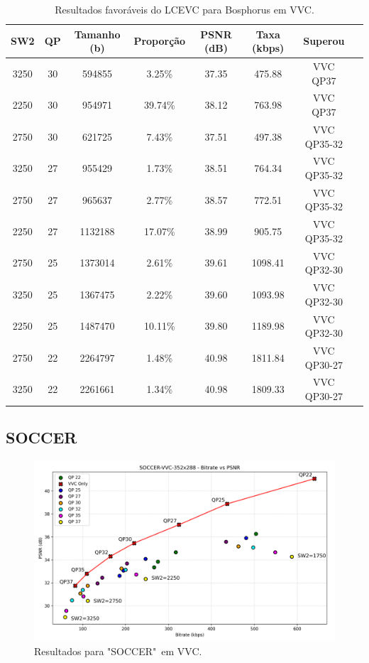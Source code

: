 \begin{table}[h]
    \centering
    \label{tab:bosphorus-vvc-lcevc}
    \begin{tabular}{|c|c|c|c|c|c|c|c|}
        \hline
        \textbf{SW2} & \textbf{QP} & \textbf{Tamanho (b)} & \textbf{Proporção} & \textbf{PSNR (dB)} & \textbf{Taxa (kbps)} & \textbf{Superou} \\
        \hline
        3250 & 30 & 594855 & 3.25\% & 37.35 & 475.88 & VVC QP37 \\
        2250 & 30 & 954971 & 39.74\% & 38.12 & 763.98 & VVC QP37 \\
        2750 & 30 & 621725 & 7.43\% & 37.51 & 497.38 & VVC QP35-32 \\
        3250 & 27 & 955429 & 1.73\% & 38.51 & 764.34 & VVC QP35-32 \\
        2750 & 27 & 965637 & 2.77\% & 38.57 & 772.51 & VVC QP35-32 \\
        2250 & 27 & 1132188 & 17.07\% & 38.99 & 905.75 & VVC QP35-32 \\
        2750 & 25 & 1373014 & 2.61\% & 39.61 & 1098.41 & VVC QP32-30 \\
        3250 & 25 & 1367475 & 2.22\% & 39.60 & 1093.98 & VVC QP32-30 \\
        2250 & 25 & 1487470 & 10.11\% & 39.80 & 1189.98 & VVC QP32-30 \\
        2750 & 22 & 2264797 & 1.48\% & 40.98 & 1811.84 & VVC QP30-27 \\
        3250 & 22 & 2261661 & 1.34\% & 40.98 & 1809.33 & VVC QP30-27 \\
        \hline
    \end{tabular}
    \caption{Resultados favoráveis do LCEVC para Bosphorus em VVC.}
\end{table}

\newpage
\subsection{SOCCER}

\begin{figure}[h]
    \centering
    \includegraphics[width=01.0\textwidth]{img/SOCCER-VVC.png}
    \caption{Resultados para "SOCCER"\ em \acrshort{VVC}. \cite{xiph}}
    \label{fig:Soccer-VVC}
\end{figure}


